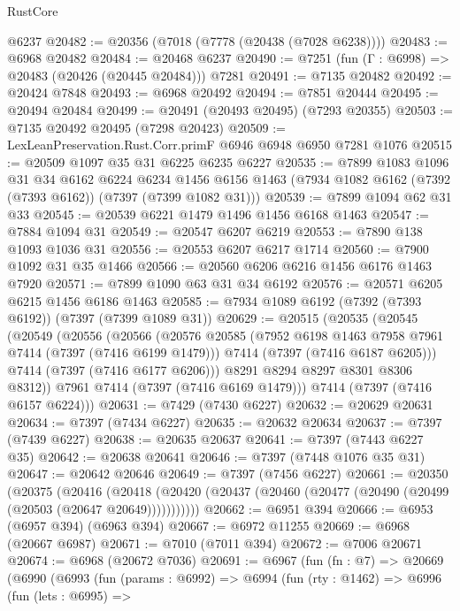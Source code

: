 \begin{lexlean}{RustCore}
\begin{coremodule}
    @6237
@20482 := @20356 (@7018 (@7778 (@20438 (@7028 @6238))))
@20483 := @6968 @20482
@20484 := @20468 @6237
@20490 := @7251 (fun (Γ : @6998) => @20483 (@20426 (@20445 @20484))) @7281
@20491 := @7135 @20482
@20492 := @20424 @7848
@20493 := @6968 @20492
@20494 := @7851 @20444
@20495 := @20494 @20484
@20499 := @20491 (@20493 @20495) (@7293 @20355)
@20503 := @7135 @20492 @20495 (@7298 @20423)
@20509 := LexLeanPreservation.Rust.Corr.primF @6946 @6948 @6950 @7281 @1076
@20515 := @20509 @1097 @35 @31 @6225 @6235 @6227
@20535 := @7899
    @1083
    @1096
    @31
    @34
    @6162
    @6224
    @6234
    @1456
    @6156
    @1463
    (@7934 @1082 @6162 (@7392 (@7393 @6162)) (@7397 (@7399 @1082 @31)))
@20539 := @7899 @1094 @62 @31 @33
@20545 := @20539 @6221 @1479 @1496 @1456 @6168 @1463
@20547 := @7884 @1094 @31
@20549 := @20547 @6207 @6219
@20553 := @7890 @138 @1093 @1036 @31
@20556 := @20553 @6207 @6217 @1714
@20560 := @7900 @1092 @31 @35 @1466
@20566 := @20560 @6206 @6216 @1456 @6176 @1463 @7920
@20571 := @7899 @1090 @63 @31 @34 @6192
@20576 := @20571 @6205 @6215 @1456 @6186 @1463
@20585 := @7934 @1089 @6192 (@7392 (@7393 @6192)) (@7397 (@7399 @1089 @31))
@20629 := @20515
    (@20535
      (@20545
        (@20549
          (@20556
            (@20566
              (@20576
                @20585
                (@7952 @6198 @1463 @7958 @7961 @7414 (@7397 (@7416 @6199 @1479)))
                @7414
                (@7397 (@7416 @6187 @6205)))
              @7414
              (@7397 (@7416 @6177 @6206)))
            @8291
            @8294
            @8297
            @8301
            @8306
            @8312))
        @7961
        @7414
        (@7397 (@7416 @6169 @1479)))
      @7414
      (@7397 (@7416 @6157 @6224)))
@20631 := @7429 (@7430 @6227)
@20632 := @20629 @20631
@20634 := @7397 (@7434 @6227)
@20635 := @20632 @20634
@20637 := @7397 (@7439 @6227)
@20638 := @20635 @20637
@20641 := @7397 (@7443 @6227 @35)
@20642 := @20638 @20641
@20646 := @7397 (@7448 @1076 @35 @31)
@20647 := @20642 @20646
@20649 := @7397 (@7456 @6227)
@20661 := @20350
    (@20375
      (@20416
        (@20418 (@20420 (@20437 (@20460 (@20477 (@20490 (@20499 (@20503 (@20647 @20649)))))))))))
@20662 := @6951 @394
@20666 := @6953 (@6957 @394) (@6963 @394)
@20667 := @6972 @11255
@20669 := @6968 (@20667 @6987)
@20671 := @7010 (@7011 @394)
@20672 := @7006 @20671
@20674 := @6968 (@20672 @7036)
@20691 := @6967
    (fun (fn : @7) =>
    @20669
      (@6990
        (@6993
          (fun (params : @6992) =>
          @6994
            (fun (rty : @1462) =>
            @6996
              (fun (lets : @6995) =>

\end{coremodule}
\end{lexlean}
